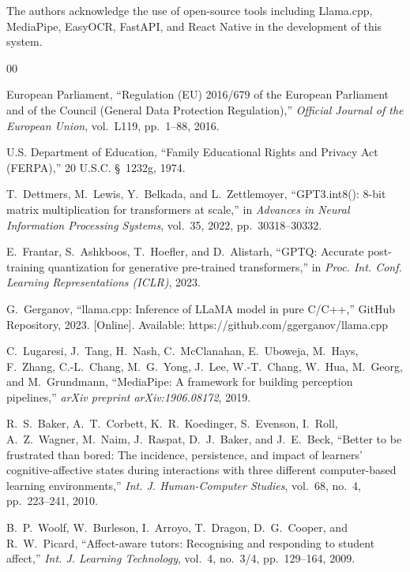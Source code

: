 \documentclass[conference]{IEEEtran}
\begin{document}
The authors acknowledge the use of open-source tools including Llama.cpp, MediaPipe, EasyOCR, FastAPI, and React Native in the development of this system.



\begin{thebibliography}{00}

European Parliament, ``Regulation (EU) 2016/679 of the European Parliament and of the Council (General Data Protection Regulation),'' \textit{Official Journal of the European Union}, vol.~L119, pp.~1--88, 2016.

U.S. Department of Education, ``Family Educational Rights and Privacy Act (FERPA),'' 20 U.S.C. \S~1232g, 1974.

T.~Dettmers, M.~Lewis, Y.~Belkada, and L.~Zettlemoyer, ``GPT3.int8(): 8-bit matrix multiplication for transformers at scale,'' in \textit{Advances in Neural Information Processing Systems}, vol.~35, 2022, pp.~30318--30332.

E.~Frantar, S.~Ashkboos, T.~Hoefler, and D.~Alistarh, ``GPTQ: Accurate post-training quantization for generative pre-trained transformers,'' in \textit{Proc. Int. Conf. Learning Representations (ICLR)}, 2023.

G.~Gerganov, ``llama.cpp: Inference of LLaMA model in pure C/C++,'' GitHub Repository, 2023. [Online]. Available: https://github.com/ggerganov/llama.cpp

C.~Lugaresi, J.~Tang, H.~Nash, C.~McClanahan, E.~Uboweja, M.~Hays, F.~Zhang, C.-L.~Chang, M.~G.~Yong, J.~Lee, W.-T.~Chang, W.~Hua, M.~Georg, and M.~Grundmann, ``MediaPipe: A framework for building perception pipelines,'' \textit{arXiv preprint arXiv:1906.08172}, 2019.

R.~S.~Baker, A.~T.~Corbett, K.~R.~Koedinger, S.~Evenson, I.~Roll, A.~Z.~Wagner, M.~Naim, J.~Raspat, D.~J.~Baker, and J.~E.~Beck, ``Better to be frustrated than bored: The incidence, persistence, and impact of learners' cognitive-affective states during interactions with three different computer-based learning environments,'' \textit{Int. J. Human-Computer Studies}, vol.~68, no.~4, pp.~223--241, 2010.

B.~P.~Woolf, W.~Burleson, I.~Arroyo, T.~Dragon, D.~G.~Cooper, and R.~W.~Picard, ``Affect-aware tutors: Recognising and responding to student affect,'' \textit{Int. J. Learning Technology}, vol.~4, no.~3/4, pp.~129--164, 2009.


\end{thebibliography}
\end{document}
